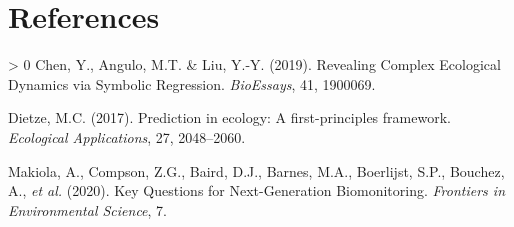 \documentclass[11pt]{article}
\newlength{\cslhangindent}
\newenvironment{CSLReferences}[3] %
 {%
  \setlength{\parindent}{0pt}
  \ifodd #1 \everypar{\setlength{\hangindent}{\cslhangindent}}\ignorespaces\fi
  \ifnum #2 > 0
  \setlength{\parskip}{#2\baselineskip}
  \fi
 }%
 {}
\begin{document}
\hypertarget{references}{%
\section*{References}\label{references}}

\hypertarget{refs}{}
\begin{CSLReferences}{1}{0}
\leavevmode\hypertarget{ref-Chen2019RevCom}{}%
Chen, Y., Angulo, M.T. \& Liu, Y.-Y. (2019). Revealing Complex
Ecological Dynamics via Symbolic Regression. \emph{BioEssays}, 41,
1900069.

\leavevmode\hypertarget{ref-Dietze2017PreEco}{}%
Dietze, M.C. (2017). Prediction in ecology: A first-principles
framework. \emph{Ecological Applications}, 27, 2048--2060.

\leavevmode\hypertarget{ref-Makiola2020KeyQue}{}%
Makiola, A., Compson, Z.G., Baird, D.J., Barnes, M.A., Boerlijst, S.P.,
Bouchez, A., \emph{et al.} (2020). Key Questions for Next-Generation
Biomonitoring. \emph{Frontiers in Environmental Science}, 7.

\end{CSLReferences}
\end{document}
